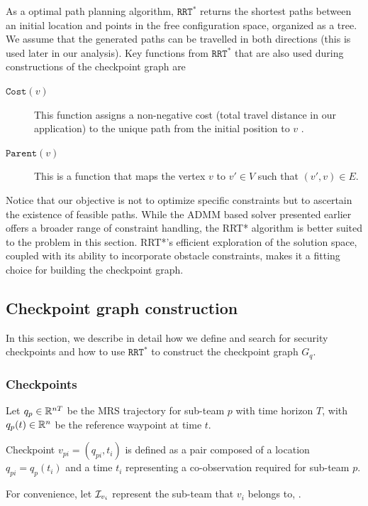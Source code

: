 \documentclass[journal]{IEEEtran}  %
\newcommand{\rrtstar}{$\texttt{RRT}^\texttt{*}$}
\begin{document}
As a optimal path planning algorithm, \rrtstar{} returns the shortest paths between an initial location and points in the free configuration space, organized as a tree. We assume that the generated paths can be travelled in both directions (this is used later in our analysis). 
Key functions from \rrtstar{} that are also used during constructions of the checkpoint graph are
\begin{description}
\item[$\texttt{Cost}(v)$] This function assigns a non-negative cost (total travel distance in our application) to the unique path from the initial position to $v$ . 
\item[$\texttt{Parent}(v)$] This is a function that maps the vertex $v$ to $v'\in V$ such that $(v',v)\in E$.
\end{description}

 Notice that our objective is not to optimize specific constraints but to ascertain the existence of feasible paths. While the ADMM based solver  presented earlier offers a broader range of constraint handling, the RRT* algorithm is better suited to the problem in this section. RRT*'s efficient exploration of the solution space, coupled with its ability to incorporate obstacle constraints, makes it a fitting choice for building the checkpoint graph.

\subsection{Checkpoint graph construction}

In this section, we describe in detail how we define and search for security checkpoints and how to use \rrtstar{} to construct the checkpoint graph $G_{q}$.

\subsubsection{Checkpoints}\label{sec:security-checkpoint}
Let $q_p\in\mathbb{R}^{nT}{}$ be the MRS trajectory for sub-team $p$ with time horizon $T$, with $q_{p}(t) \in \mathbb{R}^{n}{}$ be the reference waypoint at time $t$. 
\begin{definition}
Checkpoint $v_{pi}=(q_{pi},t_{i})$ is defined as a pair composed of a location $q_{pi}=q_{p}(t_i)$ and a time $t_{i}$ representing a co-observation required for sub-team $p$. 
\end{definition}
For convenience, let $\mathcal{I}_{v_{i}}$ represent the sub-team that $v_{i}$ belongs to, . 
\end{document}
